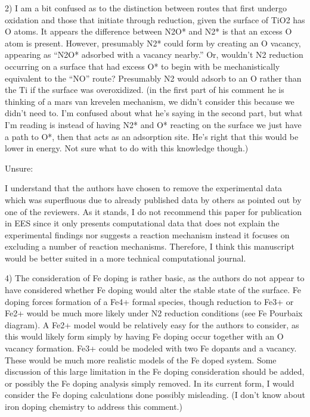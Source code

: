2)       I am a bit confused as to the distinction between routes that first undergo oxidation and those that initiate through reduction, given the surface of TiO2 has O atoms.  It appears the difference between N2O* and N2* is that an excess O atom is present.  However, presumably N2* could form by creating an O vacancy, appearing as “N2O* adsorbed with a vacancy nearby.”  Or, wouldn’t N2 reduction occurring on a surface that had excess O* to begin with be mechanistically equivalent to the “NO” route?  Presumably N2 would adsorb to an O rather than the Ti if the surface was overoxidized. (in the first part of his comment he is thinking of a mars van krevelen mechanism, we didn't consider this because we didn't need to. I'm confused about what he's saying in the second part, but what I'm reading is instead of having N2* and O* reacting on the surface we just have a path to O*, then that acts as an adsorption site. He's right that this would be lower in energy. Not sure what to do with this knowledge though.)


Unsure:

I understand that the authors have chosen to remove the experimental data which was superfluous due to already published data by others as pointed out by one of the reviewers. As it stands, I do not recommend this paper for publication in EES since it only presents computational data that does not explain the experimental findings nor suggests a reaction mechanism instead it focuses on excluding a number of reaction mechanisms. Therefore, I think this manuscript would be better suited in a more technical computational journal.

4)      The consideration of Fe doping is rather basic, as the authors do not appear to have considered whether Fe doping would alter the stable state of the surface.  Fe doping forces formation of a Fe4+ formal species, though reduction to Fe3+ or Fe2+ would be much more likely under N2 reduction conditions (see Fe Pourbaix diagram).  A Fe2+ model would be relatively easy for the authors to consider, as this would likely form simply by having Fe doping occur together with an O vacancy formation.   Fe3+ could be modeled with two Fe dopants and a vacancy.  These would be much more realistic models of the Fe doped system.  Some discussion of this large limitation in the Fe doping consideration should be added, or possibly the Fe doping analysis simply removed.  In its current form, I would consider the Fe doping calculations done possibly misleading. (I don't know about iron doping chemistry to address this comment.)

